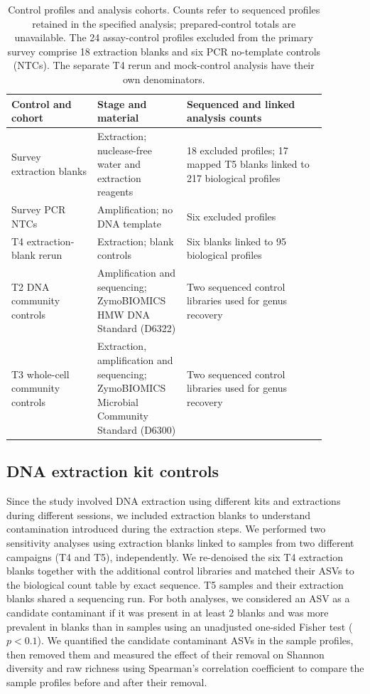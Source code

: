 \documentclass[11pt]{article}
\begin{document}
\begin{table}[htbp]\centering\small
\caption{Control profiles and analysis cohorts. Counts refer to sequenced profiles retained in the specified analysis; prepared-control totals are unavailable. The 24 assay-control profiles excluded from the primary survey comprise 18 extraction blanks and six PCR no-template controls (NTCs). The separate T4 rerun and mock-control analysis have their own denominators.}
\label{tab:controls}
\begin{tabular}{p{0.24\linewidth}p{0.25\linewidth}p{0.39\linewidth}}\toprule
Control and cohort & Stage and material & Sequenced and linked analysis counts \\\midrule
Survey extraction blanks & Extraction; nuclease-free water and extraction reagents & 18 excluded profiles; 17 mapped T5 blanks linked to 217 biological profiles \\
Survey PCR NTCs & Amplification; no DNA template & Six excluded profiles \\
T4 extraction-blank rerun & Extraction; blank controls & Six blanks linked to 95 biological profiles \\
T2 DNA community controls & Amplification and sequencing; ZymoBIOMICS HMW DNA Standard (D6322) & Two sequenced control libraries used for genus recovery \\
T3 whole-cell community controls & Extraction, amplification and sequencing; ZymoBIOMICS Microbial Community Standard (D6300) & Two sequenced control libraries used for genus recovery \\\bottomrule
\end{tabular}
\end{table}

\subsection{DNA extraction kit controls}\label{kitcontrols}
Since the study involved DNA extraction using different kits and extractions during different sessions, we included extraction blanks to understand contamination introduced during the extraction steps. We performed two sensitivity analyses using extraction blanks linked to samples from two different campaigns (T4 and T5), independently. We re-denoised the six T4 extraction blanks together with the additional control libraries and matched their ASVs to the biological count table by exact sequence. T5 samples and their extraction blanks shared a sequencing run. For both analyses, we considered an ASV as a candidate contaminant if it was present in at least $2$ blanks and was more prevalent in blanks than in samples using an unadjusted one-sided Fisher test ($p<0.1$). We quantified the candidate contaminant ASVs in the sample profiles, then removed them and measured the effect of their removal on Shannon diversity and raw richness using Spearman’s correlation coefficient to compare the sample profiles before and after their removal.
\end{document}
